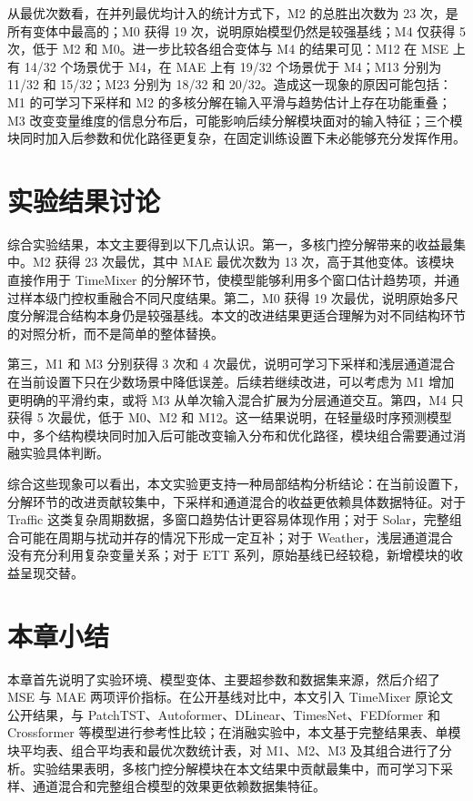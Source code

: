 从最优次数看，在并列最优均计入的统计方式下，M2 的总胜出次数为 23 次，是所有变体中最高的；M0 获得 19 次，说明原始模型仍然是较强基线；M4 仅获得 5 次，低于 M2 和 M0。进一步比较各组合变体与 M4 的结果可见：M12 在 MSE 上有 14/32 个场景优于 M4，在 MAE 上有 19/32 个场景优于 M4；M13 分别为 11/32 和 15/32；M23 分别为 18/32 和 20/32。造成这一现象的原因可能包括：M1 的可学习下采样和 M2 的多核分解在输入平滑与趋势估计上存在功能重叠；M3 改变变量维度的信息分布后，可能影响后续分解模块面对的输入特征；三个模块同时加入后参数和优化路径更复杂，在固定训练设置下未必能够充分发挥作用。

\section{实验结果讨论}

综合实验结果，本文主要得到以下几点认识。第一，多核门控分解带来的收益最集中。M2 获得 23 次最优，其中 MAE 最优次数为 13 次，高于其他变体。该模块直接作用于 TimeMixer 的分解环节，使模型能够利用多个窗口估计趋势项，并通过样本级门控权重融合不同尺度结果。第二，M0 获得 19 次最优，说明原始多尺度分解混合结构本身仍是较强基线。本文的改进结果更适合理解为对不同结构环节的对照分析，而不是简单的整体替换。

第三，M1 和 M3 分别获得 3 次和 4 次最优，说明可学习下采样和浅层通道混合在当前设置下只在少数场景中降低误差。后续若继续改进，可以考虑为 M1 增加更明确的平滑约束，或将 M3 从单次输入混合扩展为分层通道交互。第四，M4 只获得 5 次最优，低于 M0、M2 和 M12。这一结果说明，在轻量级时序预测模型中，多个结构模块同时加入后可能改变输入分布和优化路径，模块组合需要通过消融实验具体判断。

综合这些现象可以看出，本文实验更支持一种局部结构分析结论：在当前设置下，分解环节的改进贡献较集中，下采样和通道混合的收益更依赖具体数据特征。对于 Traffic 这类复杂周期数据，多窗口趋势估计更容易体现作用；对于 Solar，完整组合可能在周期与扰动并存的情况下形成一定互补；对于 Weather，浅层通道混合没有充分利用复杂变量关系；对于 ETT 系列，原始基线已经较稳，新增模块的收益呈现交替。

\section{本章小结}

本章首先说明了实验环境、模型变体、主要超参数和数据集来源，然后介绍了 MSE 与 MAE 两项评价指标。在公开基线对比中，本文引入 TimeMixer 原论文公开结果，与 PatchTST\cite{nie2023time}、Autoformer\cite{wu2021autoformer}、DLinear\cite{zeng2023transformers}、TimesNet\cite{wu2023timesnet}、FEDformer\cite{zhou2022fedformer} 和 Crossformer\cite{zhang2023crossformer} 等模型进行参考性比较；在消融实验中，本文基于完整结果表、单模块平均表、组合平均表和最优次数统计表，对 M1、M2、M3 及其组合进行了分析。实验结果表明，多核门控分解模块在本文结果中贡献最集中，而可学习下采样、通道混合和完整组合模型的效果更依赖数据集特征。

